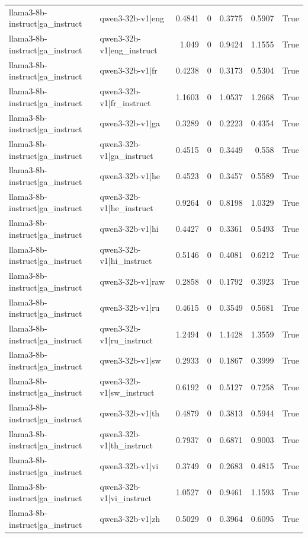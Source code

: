\begin{table}
\begin{tabular}{l l r r r r l}
llama3-8b-instruct|ga_instruct & qwen3-32b-v1|eng & 0.4841 & 0 & 0.3775 & 0.5907 & True \\
llama3-8b-instruct|ga_instruct & qwen3-32b-v1|eng_instruct & 1.049 & 0 & 0.9424 & 1.1555 & True \\
llama3-8b-instruct|ga_instruct & qwen3-32b-v1|fr & 0.4238 & 0 & 0.3173 & 0.5304 & True \\
llama3-8b-instruct|ga_instruct & qwen3-32b-v1|fr_instruct & 1.1603 & 0 & 1.0537 & 1.2668 & True \\
llama3-8b-instruct|ga_instruct & qwen3-32b-v1|ga & 0.3289 & 0 & 0.2223 & 0.4354 & True \\
llama3-8b-instruct|ga_instruct & qwen3-32b-v1|ga_instruct & 0.4515 & 0 & 0.3449 & 0.558 & True \\
llama3-8b-instruct|ga_instruct & qwen3-32b-v1|he & 0.4523 & 0 & 0.3457 & 0.5589 & True \\
llama3-8b-instruct|ga_instruct & qwen3-32b-v1|he_instruct & 0.9264 & 0 & 0.8198 & 1.0329 & True \\
llama3-8b-instruct|ga_instruct & qwen3-32b-v1|hi & 0.4427 & 0 & 0.3361 & 0.5493 & True \\
llama3-8b-instruct|ga_instruct & qwen3-32b-v1|hi_instruct & 0.5146 & 0 & 0.4081 & 0.6212 & True \\
llama3-8b-instruct|ga_instruct & qwen3-32b-v1|raw & 0.2858 & 0 & 0.1792 & 0.3923 & True \\
llama3-8b-instruct|ga_instruct & qwen3-32b-v1|ru & 0.4615 & 0 & 0.3549 & 0.5681 & True \\
llama3-8b-instruct|ga_instruct & qwen3-32b-v1|ru_instruct & 1.2494 & 0 & 1.1428 & 1.3559 & True \\
llama3-8b-instruct|ga_instruct & qwen3-32b-v1|sw & 0.2933 & 0 & 0.1867 & 0.3999 & True \\
llama3-8b-instruct|ga_instruct & qwen3-32b-v1|sw_instruct & 0.6192 & 0 & 0.5127 & 0.7258 & True \\
llama3-8b-instruct|ga_instruct & qwen3-32b-v1|th & 0.4879 & 0 & 0.3813 & 0.5944 & True \\
llama3-8b-instruct|ga_instruct & qwen3-32b-v1|th_instruct & 0.7937 & 0 & 0.6871 & 0.9003 & True \\
llama3-8b-instruct|ga_instruct & qwen3-32b-v1|vi & 0.3749 & 0 & 0.2683 & 0.4815 & True \\
llama3-8b-instruct|ga_instruct & qwen3-32b-v1|vi_instruct & 1.0527 & 0 & 0.9461 & 1.1593 & True \\
llama3-8b-instruct|ga_instruct & qwen3-32b-v1|zh & 0.5029 & 0 & 0.3964 & 0.6095 & True \\

\end{tabular}
\end{table}
